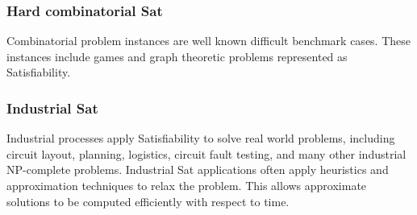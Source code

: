 		

\subsubsection{Hard combinatorial {\sc Sat}}

Combinatorial problem instances are well known difficult benchmark cases.  These instances include games and graph theoretic problems represented as {\sc Satisfiability}. 
		
\subsubsection{Industrial {\sc Sat}}

Industrial processes apply {\sc Satisfiability} to solve real world problems, including circuit layout, planning, logistics, circuit fault testing, and many other industrial \textsf{NP-complete} problems.  Industrial {\sc Sat} applications often apply heuristics and approximation techniques to relax the problem.  This allows approximate solutions to be computed efficiently with respect to time.
